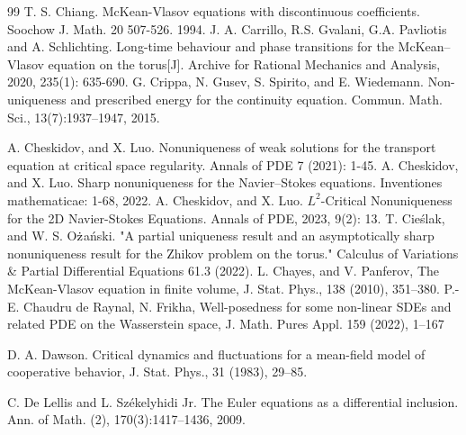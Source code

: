 \documentclass[UTF-8,reqno]{amsart}
\numberwithin{equation}{section}
\theoremstyle{definition}
\begin{document}
\begin{thebibliography}{99}
T. S. Chiang.    McKean-Vlasov equations with discontinuous coefficients. Soochow J. Math. 20 507-526. 1994. 
J. A. Carrillo, R.S. Gvalani, G.A. Pavliotis and A. Schlichting. Long-time behaviour and phase transitions for the McKean–Vlasov equation on the torus[J]. Archive for Rational Mechanics and Analysis, 2020, 235(1): 635-690.
G. Crippa, N. Gusev, S. Spirito, and E. Wiedemann. Non-uniqueness and prescribed energy for the continuity equation. Commun. Math. Sci., 13(7):1937–1947, 2015.

A. Cheskidov, and X. Luo. Nonuniqueness of weak solutions for the transport equation at critical space regularity. Annals of PDE 7 (2021): 1-45.
A. Cheskidov, and X. Luo. Sharp nonuniqueness for the Navier–Stokes equations. Inventiones mathematicae: 1-68, 2022.
A. Cheskidov, and X. Luo. $L^2$-Critical Nonuniqueness for the 2D Navier-Stokes Equations. Annals of PDE, 2023, 9(2): 13.
T. Cie\'slak, and W. S. O$\rm\dot{z}$a\'nski. "A partial uniqueness result and an asymptotically sharp nonuniqueness result for the Zhikov problem on the torus." Calculus of Variations \& Partial Differential Equations 61.3 (2022).
L. Chayes,  and V. Panferov, The McKean-Vlasov equation in finite volume, J. Stat. Phys., 138
(2010), 351–380.  
 P.-E. Chaudru de Raynal, N. Frikha, Well-posedness for some non-linear SDEs and
related PDE on the Wasserstein space, J. Math. Pures Appl. 159 (2022), 1–167

 D. A. Dawson. Critical dynamics and fluctuations for a mean-field model of cooperative
behavior, J. Stat. Phys., 31 (1983), 29–85.

C. De Lellis and L. Sz{\'e}kelyhidi Jr. The Euler equations as a differential inclusion. Ann. of Math. (2),
170(3):1417–1436, 2009.


\end{thebibliography}
\end{document}
